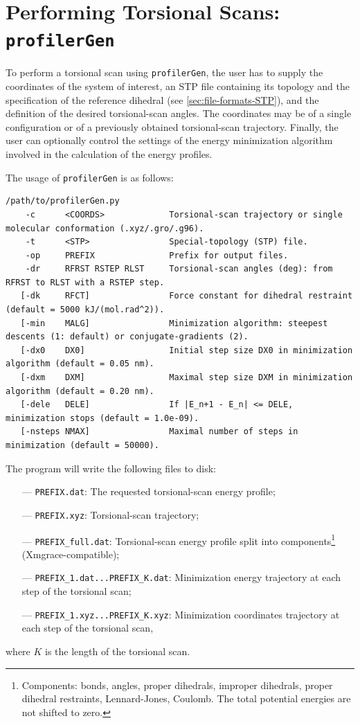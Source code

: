 \documentclass[10pt,a4paper,openany]{memoir}
\numberwithin{equation}{section}
\newcommand{\profilergen}[0]{\texttt{profilerGen}}
\begin{document}
\section{Performing Torsional Scans: \profilergen{}}
\label{sec:program-gen}

To perform a torsional scan using \profilergen{}, the user has to
supply the coordinates of the system of interest, an STP file
containing its topology and the specification of the reference
dihedral (see \autoref{sec:file-formats-STP}), and the definition of
the desired torsional-scan angles. The coordinates may be of a single
configuration or of a previously obtained torsional-scan trajectory.  Finally, the user
can optionally control the settings of the energy minimization
algorithm involved in the calculation of the energy profiles.

The usage of \profilergen{} is as follows:

\begin{lstlisting}
/path/to/profilerGen.py 
    -c      <COORDS>             Torsional-scan trajectory or single molecular conformation (.xyz/.gro/.g96).
    -t      <STP>                Special-topology (STP) file.
    -op     PREFIX               Prefix for output files.
    -dr     RFRST RSTEP RLST     Torsional-scan angles (deg): from RFRST to RLST with a RSTEP step.
   [-dk     RFCT]                Force constant for dihedral restraint (default = 5000 kJ/(mol.rad^2)).
   [-min    MALG]                Minimization algorithm: steepest descents (1: default) or conjugate-gradients (2).
   [-dx0    DX0]                 Initial step size DX0 in minimization algorithm (default = 0.05 nm).
   [-dxm    DXM]                 Maximal step size DXM in minimization algorithm (default = 0.20 nm).
   [-dele   DELE]                If |E_n+1 - E_n| <= DELE, minimization stops (default = 1.0e-09).
   [-nsteps NMAX]                Maximal number of steps in minimization (default = 50000).
\end{lstlisting}\vspace{2ex}

\noindent The program will write the following files to disk:
\begin{itemize}
\item[---] \texttt{PREFIX.dat}: The requested torsional-scan energy profile;
\item[---] \texttt{PREFIX.xyz}: Torsional-scan trajectory;
\item[---] \texttt{PREFIX\_full.dat}: Torsional-scan energy profile split into components\footnote{Components: bonds, angles, proper dihedrals, improper dihedrals, proper dihedral restraints, Lennard-Jones, Coulomb. The total potential energies are not shifted to zero.} (Xmgrace-compatible);
\item[---] \texttt{PREFIX\_1.dat...PREFIX\_K.dat}: Minimization energy trajectory at each step of the torsional scan;
\item[---] \texttt{PREFIX\_1.xyz...PREFIX\_K.xyz}: Minimization coordinates trajectory at each step of the torsional scan,
\end{itemize}
where $K$ is the length of the torsional scan.
\end{document}
